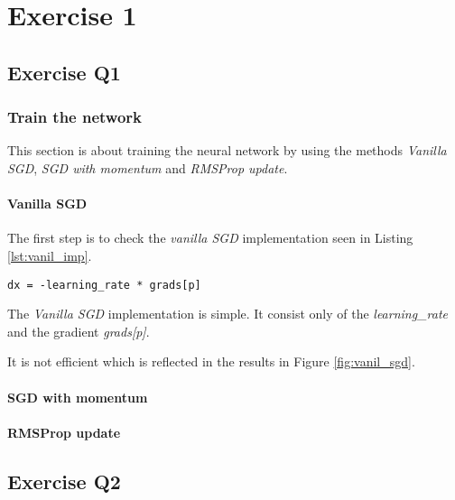 \chapter{Exercise 1}
\label{chp:e1}

\section{Exercise Q1}

\subsection{Train the network}
This section is about training the neural network by using the methods \emph{Vanilla SGD}, \emph{SGD with momentum} and \emph{RMSProp update}.

\subsubsection{Vanilla SGD}
The first step is to check the \emph{vanilla SGD} implementation seen in Listing \ref{lst:vanil_imp}.

\begin{lstlisting}[caption={Vanilla SGD implementation}, label=lst:vanil_imp, mathescape=true]
dx = -learning_rate * grads[p]
\end{lstlisting}

The \emph{Vanilla SGD} implementation is simple. It consist only of the \emph{learning\_rate} and the gradient \emph{grads[p]}. 

It is not efficient which is reflected in the results in Figure \ref{fig:vanil_sgd}.


\subsubsection{SGD with momentum}

\subsubsection{RMSProp update}
\section{Exercise Q2}